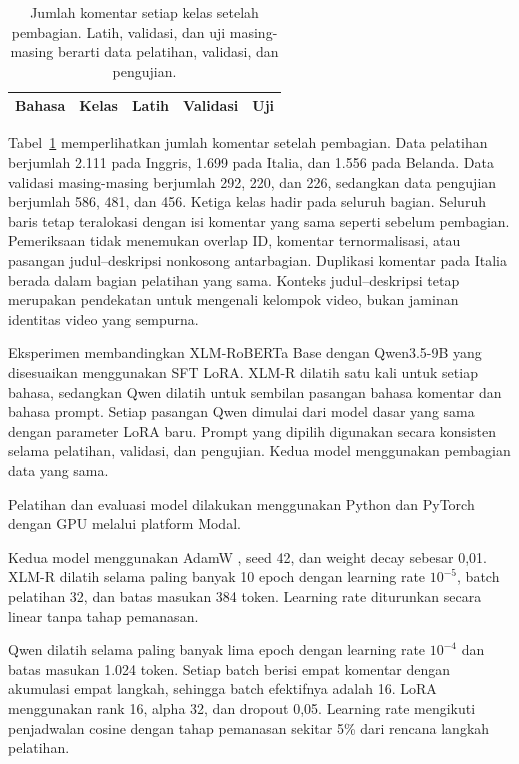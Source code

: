 \documentclass[11pt]{article}
\begin{document}
\begin{table}[ht]
\centering
\small
\setlength{\tabcolsep}{3pt}
\begin{tabular}{llrrr}
\toprule
Bahasa & Kelas & Latih & Validasi & Uji \\
\midrule

\end{tabular}
\caption{Jumlah komentar setiap kelas setelah pembagian. Latih, validasi, dan uji masing-masing berarti data pelatihan, validasi, dan pengujian.}
\label{tab:split}
\end{table}

Tabel~\ref{tab:split} memperlihatkan jumlah komentar setelah pembagian. Data pelatihan berjumlah 2.111 pada Inggris, 1.699 pada Italia, dan 1.556 pada Belanda. Data validasi masing-masing berjumlah 292, 220, dan 226, sedangkan data pengujian berjumlah 586, 481, dan 456. Ketiga kelas hadir pada seluruh bagian. Seluruh baris tetap teralokasi dengan isi komentar yang sama seperti sebelum pembagian. Pemeriksaan tidak menemukan overlap ID, komentar ternormalisasi, atau pasangan judul--deskripsi nonkosong antarbagian. Duplikasi komentar pada Italia berada dalam bagian pelatihan yang sama. Konteks judul--deskripsi tetap merupakan pendekatan untuk mengenali kelompok video, bukan jaminan identitas video yang sempurna.


Eksperimen membandingkan XLM-RoBERTa Base dengan Qwen3.5-9B yang disesuaikan menggunakan SFT LoRA. XLM-R dilatih satu kali untuk setiap bahasa, sedangkan Qwen dilatih untuk sembilan pasangan bahasa komentar dan bahasa prompt. Setiap pasangan Qwen dimulai dari model dasar yang sama dengan parameter LoRA baru. Prompt yang dipilih digunakan secara konsisten selama pelatihan, validasi, dan pengujian. Kedua model menggunakan pembagian data yang sama.

Pelatihan dan evaluasi model dilakukan menggunakan Python dan PyTorch dengan GPU melalui platform Modal.

Kedua model menggunakan AdamW \citep{loshchilov-hutter-2019-decoupled}, seed 42, dan weight decay sebesar 0,01. XLM-R dilatih selama paling banyak 10 epoch dengan learning rate $10^{-5}$, batch pelatihan 32, dan batas masukan 384 token. Learning rate diturunkan secara linear tanpa tahap pemanasan.

Qwen dilatih selama paling banyak lima epoch dengan learning rate $10^{-4}$ dan batas masukan 1.024 token. Setiap batch berisi empat komentar dengan akumulasi empat langkah, sehingga batch efektifnya adalah 16. LoRA menggunakan rank 16, alpha 32, dan dropout 0,05. Learning rate mengikuti penjadwalan cosine dengan tahap pemanasan sekitar 5\% dari rencana langkah pelatihan.
\end{document}
